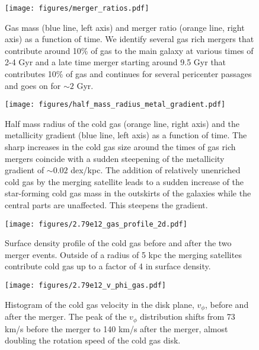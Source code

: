 \documentclass[useAMS,usenatbib]{mnras}
\begin{document}
\begin{figure*}
    \begin{centering}
        \texttt{[image: figures/merger\_ratios.pdf]}
        \caption{Gas mass (blue line, left axis) and merger ratio (orange line, right axis) as a function of time. We identify several gas rich mergers that contribute around 10\% of gas to the main galaxy at various times of 2-4 Gyr and a late time merger starting around 9.5 Gyr that contributes 10\% of gas and continues for several pericenter passages and goes on for $\sim2$ Gyr.
        }
        \label{fig:merger_ratio}
    \end{centering}
\end{figure*}



\begin{figure*}
    \begin{centering}
     \texttt{[image: figures/half\_mass\_radius\_metal\_gradient.pdf]}
        \caption{
            Half mass radius of the cold gas (orange line, right axis) and the metallicity gradient (blue line, left axis) as a function of time. The sharp increases in the cold gas size around the times of gas rich mergers coincide with a sudden steepening of the metallicity gradient of $\sim0.02$ dex/kpc. The addition of relatively unenriched cold gas by the merging satellite leads to a sudden increase of the star-forming cold gas  mass in the outskirts of the galaxies while the central parts are unaffected. This steepens the gradient.
        }
        \label{fig:half_mass}
    \end{centering}
\end{figure*}

\begin{figure}
    \begin{centering}
        \texttt{[image: figures/2.79e12\_gas\_profile\_2d.pdf]}
        \caption{
            Surface density profile of the cold gas before and after the two merger events. Outside of a radius of 5 kpc the merging satellites contribute cold gas up to a factor of 4 in surface density.
        }
        \label{fig:surf_den}
    \end{centering}
\end{figure}

\begin{figure}
    \begin{centering}
        \texttt{[image: figures/2.79e12\_v\_phi\_gas.pdf]}
        \caption{
            Histogram of the cold gas velocity in the disk plane, $v_\phi$, before and after the merger. The peak of the $v_\phi$ distribution shifts from 73 km/s before the merger to 140 km/s after the merger, almost doubling the rotation speed of the cold gas disk.
        }
        \label{fig:v_phi}
    \end{centering}
\end{figure}
\end{document}
